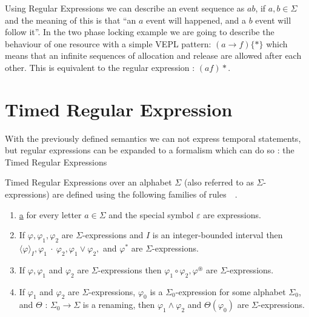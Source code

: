 		Using Regular Expressions we can describe an event sequence as $ab$, if $a,b \in \Sigma$ and the meaning of this is that ``an $a$ event will happened,
		and a $b$ event will follow it''. In the two phase locking example we are going to describe the behaviour of one resource with a simple VEPL pattern:
		$(a \rightarrow f)\{\ast\}$ which means that an infinite sequences of allocation and release are allowed after each other. This is equivalent to the 
		regular expression : $(af)\ast$.

		
	\section{Timed Regular Expression}
	
		With the previously defined semantics we can not express temporal statements,
		but regular expressions can be expanded to a formalism which can do so : 
		the Timed Regular Expressions
		

		\begin{dfn}
			\label{dfn:cep:tre}
			Timed Regular Expressions over an alphabet $\Sigma$ (also referred to as $\Sigma$-expressions)
			are defined using the following families of rules~\citep{tre}~.
			\begin{enumerate}
				\item \underline{a} for every letter $a \in \Sigma$ and the special symbol $\varepsilon$ are expressions.
				\item If $\varphi, \varphi_1, \varphi_2$ are $\Sigma$-expressions and $I$ is an integer-bounded interval then
					$\langle\varphi\rangle_I, \varphi_1~\cdot~\varphi_2, \varphi_1 \vee \varphi_2,$ and $\varphi^\ast$ are $\Sigma$-expressions.
				\item If $\varphi, \varphi_1$ and $\varphi_2$ are $\Sigma$-expressions then $\varphi_1 \circ \varphi_2, \varphi^\circledast$ are
					$\Sigma$-expressions.
				\item If $\varphi_1$ and $\varphi_2$ are $\Sigma$-expressions, $\varphi_0$ is a $\Sigma_0$-expression
					for some alphabet $\Sigma_0$, and $\Theta$ : $\Sigma_0 \rightarrow \Sigma$ is
					a renaming, then $\varphi_1 \wedge \varphi_2$ and $\Theta(\varphi_0)$ are $\Sigma$-expressions.
			\end{enumerate}
		\end{dfn}
		
